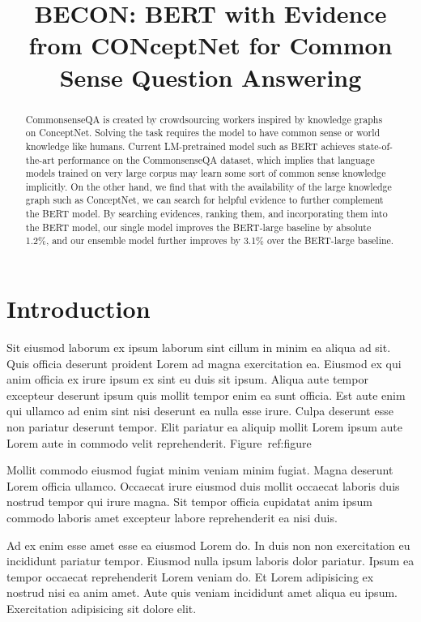 \documentclass[letterpaper]{article} %
\title{BECON: \textbf{B}ERT with \textbf{E}vidence from \textbf{CON}ceptNet for Common Sense Question Answering}
\begin{document}
\maketitle

\begin{abstract}

  CommonsenseQA is created by crowdsourcing workers inspired by knowledge graphs on ConceptNet. Solving the task requires the model to have common sense or world knowledge like humans. Current LM-pretrained model such as BERT achieves state-of-the-art performance on the CommonsenseQA dataset, which implies that language models trained on very large corpus may learn some sort of common sense knowledge implicitly. On the other hand, we find that with the availability of the large knowledge graph such as ConceptNet, we can search for helpful evidence to further complement the BERT model. By searching evidences, ranking them, and incorporating them into the BERT model, our single model improves the BERT-large baseline by absolute 1.2\%, and our ensemble model further improves by 3.1\% over the BERT-large baseline.

\end{abstract}

\section{Introduction}

Sit eiusmod laborum ex ipsum laborum sint cillum in minim ea aliqua ad sit. Quis officia deserunt proident Lorem ad magna exercitation ea. Eiusmod ex qui anim officia ex irure ipsum ex sint eu duis sit ipsum. Aliqua aute tempor excepteur deserunt ipsum quis mollit tempor enim ea sunt officia. Est aute enim qui ullamco ad enim sint nisi deserunt ea nulla esse irure. Culpa deserunt esse non pariatur deserunt tempor. Elit pariatur ea aliquip mollit Lorem ipsum aute Lorem aute in commodo velit reprehenderit. Figure~{ref:figure}

Mollit commodo eiusmod fugiat minim veniam minim fugiat. Magna deserunt Lorem officia ullamco. Occaecat irure eiusmod duis mollit occaecat laboris duis nostrud tempor qui irure magna. Sit tempor officia cupidatat anim ipsum commodo laboris amet excepteur labore reprehenderit ea nisi duis.

Ad ex enim esse amet esse ea eiusmod Lorem do. In duis non non exercitation eu incididunt pariatur tempor. Eiusmod nulla ipsum laboris dolor pariatur. Ipsum ea tempor occaecat reprehenderit Lorem veniam do. Et Lorem adipisicing ex nostrud nisi ea anim amet. Aute quis veniam incididunt amet aliqua eu ipsum. Exercitation adipisicing sit dolore elit.
\end{document}

